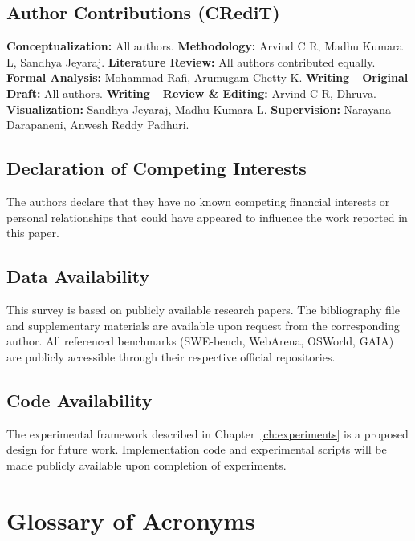 \documentclass[12pt,a4paper]{report}
\theoremstyle{definition}
\begin{document}
\section*{Author Contributions (CRediT)}
\noindent\textbf{Conceptualization:} All authors. \textbf{Methodology:} Arvind C R, Madhu Kumara L, Sandhya Jeyaraj. \textbf{Literature Review:} All authors contributed equally. \textbf{Formal Analysis:} Mohammad Rafi, Arumugam Chetty K. \textbf{Writing---Original Draft:} All authors. \textbf{Writing---Review \& Editing:} Arvind C R, Dhruva. \textbf{Visualization:} Sandhya Jeyaraj, Madhu Kumara L. \textbf{Supervision:} Narayana Darapaneni, Anwesh Reddy Padhuri.

\section*{Declaration of Competing Interests}
The authors declare that they have no known competing financial interests or personal relationships that could have appeared to influence the work reported in this paper.

\section*{Data Availability}
This survey is based on publicly available research papers. The bibliography file and supplementary materials are available upon request from the corresponding author. All referenced benchmarks (SWE-bench, WebArena, OSWorld, GAIA) are publicly accessible through their respective official repositories.

\section*{Code Availability}
The experimental framework described in Chapter~\ref{ch:experiments} is a proposed design for future work. Implementation code and experimental scripts will be made publicly available upon completion of experiments.

\appendix

\chapter{Glossary of Acronyms}
\label{app:glossary}
\end{document}
